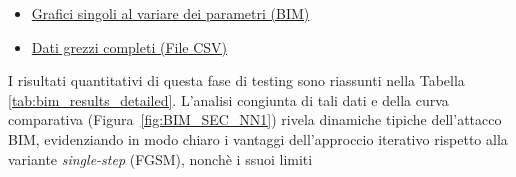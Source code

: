 \documentclass[a4paper, 12pt]{article}
\begin{document}
\begin{itemize}
    \item \href{https://github.com/ChristianRosa02/AI4Cybersecurity/tree/master/results/BIM}{Grafici singoli al variare dei parametri (BIM)}
    \item \href{https://github.com/ChristianRosa02/AI4Cybersecurity/blob/master/results/BIM/BIM_results.csv}{Dati grezzi completi (File CSV)}
\end{itemize}

I risultati quantitativi di questa fase di testing sono riassunti nella Tabella \ref{tab:bim_results_detailed}. 
L'analisi congiunta di tali dati e della curva comparativa (Figura~\ref{fig:BIM_SEC_NN1}) rivela dinamiche tipiche dell'attacco BIM, 
evidenziando in modo chiaro i vantaggi dell'approccio iterativo rispetto alla variante \textit{single-step} (FGSM), nonchè i ssuoi limiti

\begin{table}[H]
    \centering
    \caption{Accuratezza del modello e tempo di esecuzione esatto sotto attacco BIM al variare del budget di perturbazione ($\epsilon$) e del numero massimo di iterazioni.}
    \label{tab:bim_results_detailed}
\end{table}
\end{document}
